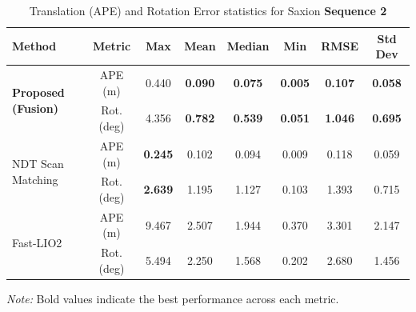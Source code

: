 \begin{table}[H]
	\centering
	\renewcommand{\arraystretch}{0.6}
	\setlength{\tabcolsep}{15pt}
	\caption{Translation (APE) and Rotation Error statistics for Saxion \textbf{Sequence 2} }
	\label{tab:ape_rot_saxion_seq2}
	
	\begin{adjustbox}{width=\textwidth}
		\begin{tabular}{@{}lccccccc@{}}
			\toprule
			\textbf{Method} & \textbf{Metric} & \textbf{Max} & \textbf{Mean} & \textbf{Median} & \textbf{Min} & \textbf{RMSE} & \textbf{Std Dev} \\
			\midrule
			
			\multirow{2}{*}{\textbf{Proposed (Fusion)}} 
			& APE (m)        & 0.440   & \textbf{0.090}   & \textbf{0.075}     & \textbf{0.005}   & \textbf{0.107}   & \textbf{0.058} \\
			& Rot. (deg)     & 4.356   & \textbf{0.782}   & \textbf{0.539}     & \textbf{0.051}   & \textbf{1.046}   & \textbf{0.695} \\
			\midrule
			
			\multirow{2}{*}{NDT Scan Matching} 
			& APE (m)        & \textbf{0.245}   & 0.102   & 0.094     & 0.009    & 0.118   & 0.059 \\
			& Rot. (deg)     & \textbf{2.639}   & 1.195   & 1.127     & 0.103    & 1.393   & 0.715 \\
			\midrule
			
			\multirow{2}{*}{Fast-LIO2} 
			& APE (m)        & 9.467   & 2.507   & 1.944     & 0.370    & 3.301   & 2.147 \\
			& Rot. (deg)     & 5.494   & 2.250   & 1.568     & 0.202    & 2.680   & 1.456 \\
			\bottomrule
		\end{tabular}
	\end{adjustbox}

\vspace{0.5em}
{\footnotesize \textit{Note:} Bold values indicate the best performance across each metric.}
\end{table}


